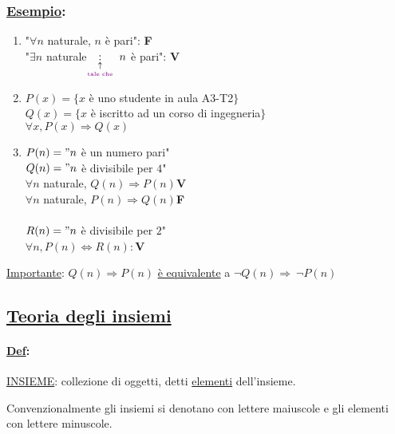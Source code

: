 \documentclass{article}
\newcommand{\ul}[1]{\underline{#1}}
\newcommand{\Def}[2]{\paragraph{\ul{Def}:}#1\\\hspace*{3em}\begin{minipage}{.8\textwidth}#2\end{minipage}}
\newcommand{\Esempio}[1]{\subsubsection*{\ul{Esempio}:}#1}
\begin{document}
\Esempio{
	\begin{enumerate}
		\item "$\forall n$ naturale, $n$ è pari": \textbf{\color{red}F}\\
		  "$\exists n$ naturale$\underset{\underset{\text{\color{violet}tale che}}{\uparrow}}{:}\ n$ è pari": \textbf{\color{green}V}
		\item $P(x)=\{x$ è uno studente in aula A3-T2$\}$\\
		  $Q(x)=\{x$ è iscritto ad un corso di ingegneria$\}$\\
		  $\forall x, P(x)\Rightarrow Q(x)$
		\item $P(n)="n$ è un numero pari"\\
		  $Q(n)="n$ è divisibile per $4$"\\
		  $\forall n$ naturale, $Q(n)\Rightarrow P(n)$\textbf{\color{green}V}\\
		  $\forall n$ naturale, $P(n)\Rightarrow Q(n)$\textbf{\color{red}F}\\\\
		  $R(n)="n$ è divisibile per $2$"\\
		  $\forall n, P(n)\Leftrightarrow R(n):$\textbf{\color{green}V}
	\end{enumerate}
	\ul{Importante}: $Q(n)\Rightarrow P(n)$ \ul{è equivalente} a $\neg Q(n)\Rightarrow\ \neg P(n)$
}

\subsection{\color{blue}\ul{Teoria degli insiemi}}
\Def{\ul{INSIEME}: collezione di oggetti, detti \ul{elementi} dell'insieme.}
{Convenzionalmente gli insiemi si denotano con lettere maiuscole e gli elementi con lettere minuscole.}
\end{document}
